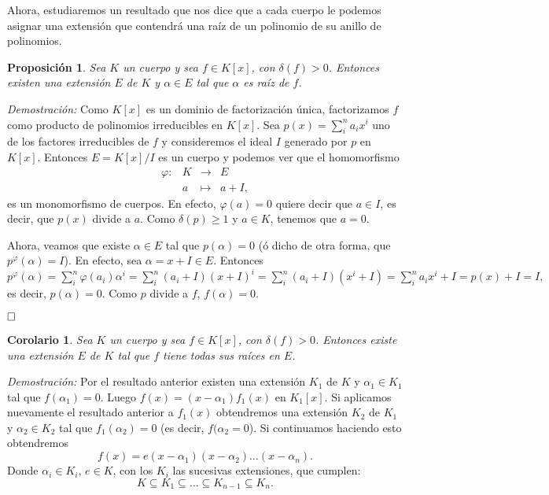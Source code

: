 \documentclass[12pt]{article}
\newtheorem{proposition}[theorem]{Proposición}
\newtheorem{corolario}{Corolario}[theorem]
\begin{document}
Ahora, estudiaremos un resultado que nos dice que a cada cuerpo le podemos asignar una extensión que contendrá una raíz de un polinomio de su anillo de polinomios.

\begin{proposition} Sea $K$ un cuerpo y sea $f \in K[x]$, con $\delta(f) > 0$. Entonces existen una extensión $E$ de $K$ y $\alpha \in E$ tal que $\alpha$ es raíz de $f$.
\end{proposition}
\emph{Demostración: } Como $K[x]$ es un dominio de factorización única, factorizamos $f$ como producto de polinomios irreducibles en $K[x]$. Sea $p(x) = \sum_{i}^{n}a_{i}x^{i}$ uno de los factores irreducibles de $f$ y consideremos el ideal $I$ generado por $p$ en $K[x]$. Entonces $E = K[x]/I$ es un cuerpo y podemos ver que el homomorfismo $$\begin{array}{rccl}
\varphi \colon &K&\longrightarrow &E \\
&a& \longmapsto &a + I,
\end{array}
$$ es un monomorfismo de cuerpos. En efecto, $\varphi (a) = 0$ quiere decir que $a \in I$, es decir, que $p(x)$ divide a $a$. Como $\delta (p) \geq 1$ y $a \in K$, tenemos que $a = 0$.

Ahora, veamos que existe $\alpha \in E$ tal que $p(\alpha) = 0$ (ó dicho de otra forma, que $p^{\varphi} (\alpha) = I$). En efecto, sea $\alpha = x + I \in E$. Entonces $p^{\varphi} (\alpha) = \sum_{i}^{n}\varphi(a_{i})\alpha^{i} = \sum_{i}^{n}(a_{i} + I) (x + I)^{i} = \sum_{i}^{n}(a_{i} + I) (x^{i} + I) = \sum_{i}^{n}a_{i}x^{i} + I = p(x) + I = I,$ es decir, $p(\alpha) = 0$. Como $p$ divide a $f$, $f(\alpha) = 0$.

$\hfill \square$

\begin{corolario}Sea $K$ un cuerpo y sea $f \in K[x]$, con $\delta(f) > 0$. Entonces existe una extensión $E$ de $K$ tal que $f$ tiene todas sus raíces en $E$.
\end{corolario}
\emph{Demostración: } Por el resultado anterior existen una extensión $K_{1}$ de $K$ y $\alpha_{1} \in K_{1}$ tal que $f(\alpha_{1}) = 0$. Luego $f(x) = (x-\alpha_{1})f_{1}(x)$ en $K_{1}[x]$. Si aplicamos nuevamente el resultado anterior a $f_{1}(x)$ obtendremos una extensión $K_{2}$ de $K_{1}$ y $\alpha_{2} \in K_{2}$ tal que $f_{1}(\alpha_{2}) = 0$ (es decir, $f(\alpha_{2} = 0$). Si continuamos haciendo esto obtendremos $$f(x) = e(x-\alpha_{1})(x-\alpha_{2}) \ldots (x-\alpha_{n}).$$ Donde $\alpha_{i} \in K_{i}$, $e \in K$, con los $K_{i}$ las sucesivas extensiones, que cumplen: $$K \subseteq K_{1} \subseteq \ldots \subseteq K_{n-1} \subseteq K_{n}.$$
\end{document}
